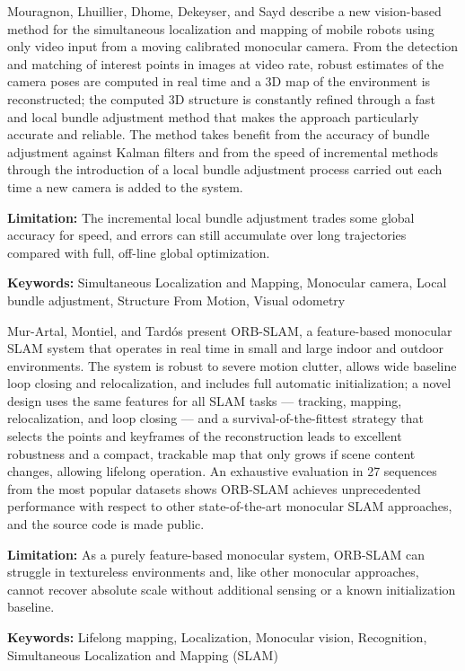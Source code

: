 {
	Mouragnon, Lhuillier, Dhome, Dekeyser, and Sayd \cite{Lhuillier:2006} describe a new vision-based method for the simultaneous localization and mapping of mobile robots using only video input from a moving calibrated monocular camera. From the detection and matching of interest points in images at video rate, robust estimates of the camera poses are computed in real time and a 3D map of the environment is reconstructed; the computed 3D structure is constantly refined through a fast and local bundle adjustment method that makes the approach particularly accurate and reliable. The method takes benefit from the accuracy of bundle adjustment against Kalman filters and from the speed of incremental methods through the introduction of a local bundle adjustment process carried out each time a new camera is added to the system.
	
	\bigskip
	\textbf{Limitation:} The incremental local bundle adjustment trades some global accuracy for speed, and errors can still accumulate over long trajectories compared with full, off-line global optimization.
	
	\scriptsize{\textbf{Keywords:} Simultaneous Localization and Mapping, Monocular camera, Local bundle adjustment, Structure From Motion, Visual odometry}
}

{
	Mur-Artal, Montiel, and Tardós \cite{MurArtal:2015} present ORB-SLAM, a feature-based monocular SLAM system that operates in real time in small and large indoor and outdoor environments. The system is robust to severe motion clutter, allows wide baseline loop closing and relocalization, and includes full automatic initialization; a novel design uses the same features for all SLAM tasks — tracking, mapping, relocalization, and loop closing — and a survival-of-the-fittest strategy that selects the points and keyframes of the reconstruction leads to excellent robustness and a compact, trackable map that only grows if scene content changes, allowing lifelong operation. An exhaustive evaluation in 27 sequences from the most popular datasets shows ORB-SLAM achieves unprecedented performance with respect to other state-of-the-art monocular SLAM approaches, and the source code is made public.
	
	\bigskip
	\textbf{Limitation:} As a purely feature-based monocular system, ORB-SLAM can struggle in textureless environments and, like other monocular approaches, cannot recover absolute scale without additional sensing or a known initialization baseline.
	
	\scriptsize{\textbf{Keywords:} Lifelong mapping, Localization, Monocular vision, Recognition, Simultaneous Localization and Mapping (SLAM)}
}

